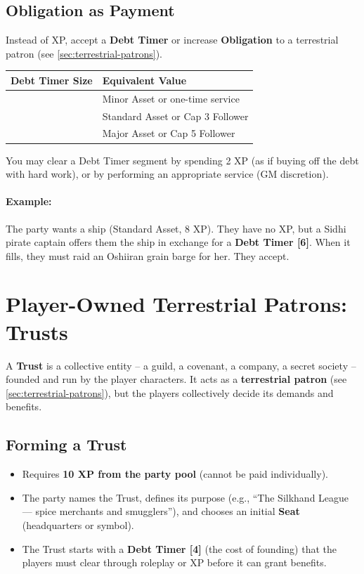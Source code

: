 \subsection{Obligation as Payment}
\label{subsec:obligation-payment}

Instead of XP, accept a \textbf{Debt Timer} or increase \textbf{Obligation} to a terrestrial patron (see \ref{sec:terrestrial-patrons}).

\begin{center}
\begin{tabular}{ll}
\toprule
\textbf{Debt Timer Size} & \textbf{Equivalent Value} \\
\midrule
[4] & Minor Asset or one-time service \\
[6] & Standard Asset or Cap 3 Follower \\
[8] & Major Asset or Cap 5 Follower \\
\bottomrule
\end{tabular}
\end{center}

You may clear a Debt Timer segment by spending 2 XP (as if buying off the debt with hard work), or by performing an appropriate service (GM discretion).

\paragraph{Example:} The party wants a ship (Standard Asset, 8 XP). They have no XP, but a Sidhi pirate captain offers them the ship in exchange for a \textbf{Debt Timer [6]}. When it fills, they must raid an Oshiiran grain barge for her. They accept.

\section{Player-Owned Terrestrial Patrons: Trusts}
\label{sec:trusts}

A \textbf{Trust} is a collective entity -- a guild, a covenant, a company, a secret society -- founded and run by the player characters. It acts as a \textbf{terrestrial patron} (see \ref{sec:terrestrial-patrons}), but the players collectively decide its demands and benefits.

\subsection{Forming a Trust}
\label{sec:forming-trust}

\begin{itemize}
  \item Requires \textbf{10 XP from the party pool} (cannot be paid individually).
  \item The party names the Trust, defines its purpose (e.g., ``The Silkhand League --- spice merchants and smugglers''), and chooses an initial \textbf{Seat} (headquarters or symbol).
  \item The Trust starts with a \textbf{Debt Timer [4]} (the cost of founding) that the players must clear through roleplay or XP before it can grant benefits.
\end{itemize}

